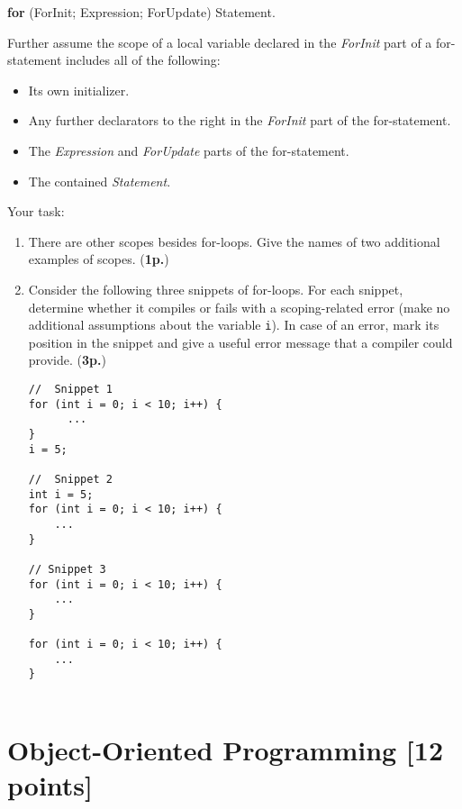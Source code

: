\documentclass{article}
\begin{document}
\begin{enumerate}
\begin{center}
  \textbf{for} (ForInit; Expression; ForUpdate) Statement.
\end{center}
Further assume the scope of a local variable declared in the 
\textit{ForInit} part of a 
for-statement includes all of the following:
\begin{itemize}
    \item Its own initializer.
    \item Any further declarators to the right in the \textit{ForInit} 
          part of the for-statement.
    \item The \textit{Expression} and \textit{ForUpdate} parts of the 
          for-statement.
    \item The contained \textit{Statement}. 
\end{itemize}

Your task:
\begin{enumerate}
\item There are other scopes besides for-loops. Give the names of two
additional examples of scopes. 
(\textbf{1p.})
\item Consider the following three snippets of for-loops. For each snippet, 
determine whether it compiles or fails with a scoping-related error
(make no additional assumptions about the variable \texttt{i}). In case
of an error, mark its position in the snippet and give a useful error message
that a compiler could provide. (\textbf{3p.})
{\small
\begin{verbatim}
//  Snippet 1
for (int i = 0; i < 10; i++) {
      ... 
}
i = 5;      

//  Snippet 2 
int i = 5;
for (int i = 0; i < 10; i++) {   
    ...
}
    
// Snippet 3
for (int i = 0; i < 10; i++) {
    ...
}

for (int i = 0; i < 10; i++) { 
    ...
}
    
\end{verbatim}
}


\end{enumerate}
\end{enumerate}

\newpage
\section{Object-Oriented Programming [12 points]}
\end{document}

